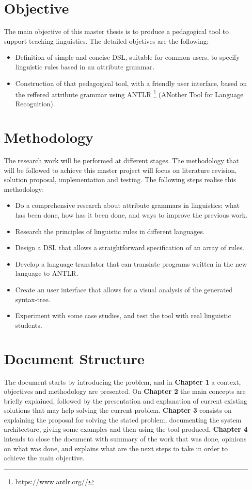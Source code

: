 	
\section{Objective}
The main objective of this master thesis is to produce a pedagogical tool to support teaching linguistics. The detailed objetives are the following:

\begin{itemize}
    \item Definition of simple and concise \textsc{DSL}, suitable for common users, to specify linguistic rules based in an attribute grammar.
    \item Construction of that pedagogical tool, with a friendly user interface, based on the reffered attribute grammar using \textsc{ANTLR} \footnote{https://www.antlr.org//} (ANother Tool for Language Recognition).
\end{itemize}
    
\section{Methodology}
The research work will be performed at different stages. The methodology that will be followed to achieve this master project will focus on literature revision, solution proposal, implementation and testing. The following steps realise this methodology:

\begin{itemize}
    \item Do a comprehensive research about attribute grammars in linguistics: what has been done, how has it been done, and ways to improve the previous work.
    \item Research the principles of linguistic rules in different languages.
    \item Design a \textsc{DSL} that allows a straightforward specification of an array of rules.
    \item Develop a language translator that can translate programs written in the new language to \textsc{ANTLR}.
    \item Create an user interface that allows for a visual analysis of the generated syntax-tree.
    \item Experiment with some case studies, and test the tool with real linguistic students.
\end{itemize}
    
\section{Document Structure}
The document starts by introducing the problem, and in \textbf{Chapter 1} a context, objectives and methodology are presented.
On \textbf{Chapter 2} the main concepts are briefly explained, followed by the presentation and explanation of current existing solutions that may help solving the current problem.
\textbf{Chapter 3} consists on explaining the proposal for solving the stated problem, documenting the system architecture, giving some examples and then using the tool produced.
\textbf{Chapter 4} intends to close the document with summary of the work that was done, opinions on what was done, and explains what are the next steps to take in order to achieve the main objective.
